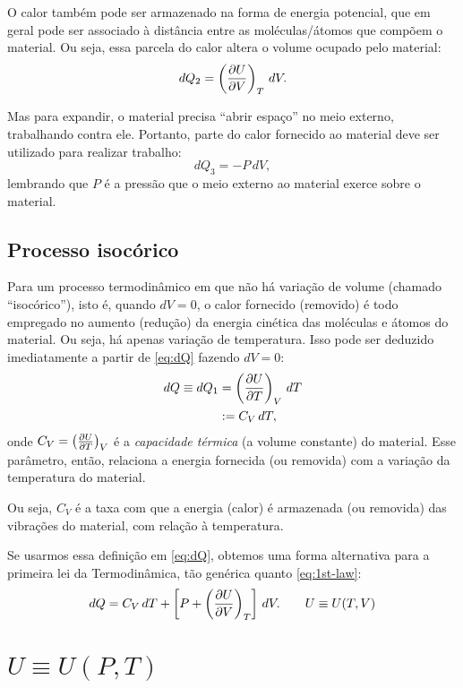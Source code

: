 \documentclass[a4paper,12pt]{scrartcl}
\begin{document}
  O calor também pode ser armazenado na forma de energia potencial, que em geral pode ser associado à distância entre as moléculas/átomos que compõem o material. Ou seja, essa parcela do calor altera o volume ocupado pelo material:
  \begin{equation*}
  dQ_2 = \left(\frac{\partial U}{\partial V}\right)_{T}\, dV.
  \end{equation*}
  
  Mas para expandir, o material precisa ``abrir espaço'' no meio externo, trabalhando contra ele. Portanto, parte do calor fornecido ao material deve ser utilizado para realizar trabalho:
  \begin{equation*}
  dQ_3 = -P\, dV,
  \end{equation*}
  lembrando que $P$ é a pressão que o meio externo ao material exerce sobre o material.

  \subsection{Processo isocórico}
  
  Para um processo termodinâmico em que não há variação de volume (chamado ``isocórico''), isto é, quando $dV = 0$, o calor fornecido (removido) é todo empregado no aumento (redução) da energia cinética das moléculas e átomos do material. Ou seja, há apenas variação de temperatura. Isso pode ser deduzido imediatamente a partir de \eqref{eq:dQ} fazendo $dV = 0$:
  \begin{align*}
  dQ \equiv dQ_1 &= \left(\frac{\partial U}{\partial T}\right)_{V}\, dT\\
                 &:= C_V\, dT,
  \end{align*}
  onde $C_V = \left(\frac{\partial U}{\partial T}\right)_{V}$ é a \emph{capacidade térmica} (a volume constante) do material. Esse parâmetro, então, relaciona a energia fornecida (ou removida) com a variação da temperatura do material.
  
  Ou seja, $C_V$ é a taxa com que a energia (calor) é armazenada (ou removida) das vibrações do material, com relação à temperatura.
  
  Se usarmos essa definição em \eqref{eq:dQ}, obtemos uma forma alternativa para a primeira lei da Termodinâmica, tão genérica quanto \eqref{eq:1st-law}:
  \begin{equation}
  dQ = C_V\, dT + \left[P + \left(\frac{\partial U}{\partial V}\right)_{T}\right]\, dV.\qquad U\equiv U(T,V)
  \end{equation}

  \section{$U \equiv U(P,T)$}
  
\end{document}
